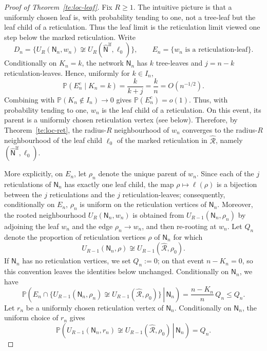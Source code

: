 \documentclass[english,11pt]{smfart}
\newcommand{\Prb}[1]{\mathbb{P}\left(#1\right)}
\newcommand{\convdis}{\,{\buildrel \mathrm{d} \over \longrightarrow}\,}
\newcommand{\cR}{\mathcal{R}}
\newcommand{\mN}{\mathsf{N}}
\newtheorem{theorem}{Theorem}[section]
\numberwithin{equation}{section}
\begin{document}
\begin{proof}[Proof of Theorem~\ref{te:loc-leaf}]
Fix \(R\ge1\). The intuitive picture is that a uniformly chosen leaf is,
with probability tending to one, not a tree-leaf but the leaf child of a
reticulation. Thus the leaf limit is the reticulation limit viewed one step
below the marked reticulation.
\smallskip
Write
\[
  D_n=\{U_R(\mN_n,w_n)\not\cong
  U_R(\hat{\mN}^{\mathrm{lf}},\ell_0)\},
  \qquad
  E_n=\{w_n\text{ is a reticulation-leaf}\}.
\]
Conditionally on \(K_n=k\), the network \(\mN_n\) has \(k\) tree-leaves and
\(j=n-k\) reticulation-leaves. Hence, uniformly for \(k\in I_n\),
\[
  \Prb{E_n^c\mid K_n=k}
  =
  \frac{k}{k+j}
  =
  \frac{k}{n}
  =
  O(n^{-1/2}).
\]
Combining with $\Prb{K_n\notin I_n}\to 0$ gives $\Prb{E_n^c}=o(1)$.
Thus, with probability tending to one, \(w_n\) is
the leaf child of a reticulation. On this event, its parent is a uniformly
chosen reticulation vertex (see below). Therefore, by
Theorem~\ref{te:loc-ret}, the radius-\(R\) neighbourhood of \(w_n\) converges
to the radius-\(R\) neighbourhood of the leaf child \(\ell_0\) of the marked
reticulation in \(\hat{\cR}\), namely \((\hat{\mN}^{\mathrm{lf}},\ell_0)\).
\smallskip

More explicitly, on $E_n$, let $\rho_n$ denote the unique parent of $w_n$.
Since each of the $j$ reticulations of $\mN_n$ has exactly one leaf child,
the map $\rho\mapsto\ell(\rho)$ is a bijection between the $j$ reticulations
and the $j$ reticulation-leaves; consequently, conditionally on $E_n$,
$\rho_n$ is uniform on the reticulation vertices of $\mN_n$. Moreover,
the rooted neighbourhood \(U_R(\mN_n,w_n)\) is obtained from
\(U_{R-1}(\mN_n,\rho_n)\) by adjoining the leaf \(w_n\) and the edge
\(\rho_n\to w_n\), and then re-rooting at \(w_n\). Let \(Q_n\) denote the proportion of reticulation vertices \(\rho\) of
\(\mN_n\) for which
\[
U_{R-1}(\mN_n,\rho)\not\cong
U_{R-1}(\hat{\cR},\rho_0).
\]
If \(\mN_n\) has no reticulation vertices, we set \(Q_n:=0\); on that event
\(n-K_n=0\), so this convention leaves the identities below unchanged. Conditionally on \(\mN_n\), we have
\[
\Prb{\left.
E_n\cap
\{U_{R-1}(\mN_n,\rho_n)\not\cong
U_{R-1}(\hat{\cR},\rho_0)\}
\,\right|\,\mN_n}
=
\frac{n-K_n}{n}\,Q_n
\le Q_n.
\]
Let \(r_n\) be a uniformly chosen reticulation vertex of \(\mN_n\).
Conditionally on \(\mN_n\), the uniform choice of \(r_n\) gives
\[
\Prb{\left.
U_{R-1}(\mN_n,r_n)\not\cong
U_{R-1}(\hat{\cR},\rho_0)
\,\right|\,\mN_n}
=
Q_n.
\]


\end{proof}
\end{document}

